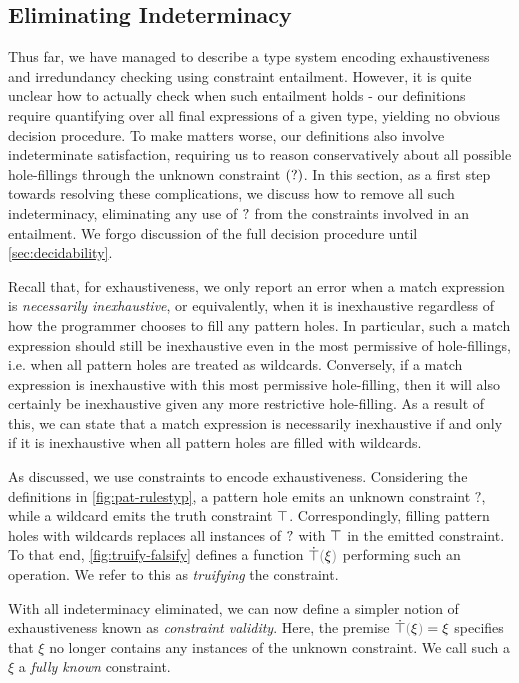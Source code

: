 \subsection{Eliminating Indeterminacy}\label{sec:analyses}
Thus far, we have managed to describe a type system encoding exhaustiveness and irredundancy checking using constraint entailment. However, it is quite unclear how to actually check when such entailment holds - our definitions require quantifying over all final expressions of a given type, yielding no obvious decision procedure. To make matters worse, our definitions also involve indeterminate satisfaction, requiring us to reason conservatively about all possible hole-fillings through the unknown constraint $(\mathtt{?})$. In this section, as a first step towards resolving these complications, we discuss how to remove all such indeterminacy, eliminating any use of $\mathtt{?}$ from the constraints involved in an entailment. We forgo discussion of the full decision procedure until \autoref{sec:decidability}.

Recall that, for exhaustiveness, we only report an error when a  match expression is \emph{necessarily inexhaustive}, or equivalently, when it is inexhaustive regardless of how the programmer chooses to fill any pattern holes. In particular, such a match expression should still be inexhaustive even in the most permissive of hole-fillings, i.e. when all pattern holes are treated as wildcards. Conversely, if a match expression is inexhaustive with this most permissive hole-filling, then it will also certainly be inexhaustive given any more restrictive hole-filling. As a result of this, we can state that a match expression is necessarily inexhaustive if and only if it is inexhaustive when all pattern holes are filled with wildcards. 

As discussed, we use constraints to encode exhaustiveness. Considering the definitions in \autoref{fig:pat-rulestyp}, a pattern hole emits an unknown constraint $?$, while a wildcard emits the truth constraint $\top$. Correspondingly, filling pattern holes with wildcards replaces all instances of $\mathtt{?}$ with $\top$ in the emitted constraint. To that end, \autoref{fig:truify-falsify} defines a function $\ctruify{\xi}$ performing such an operation. We refer to this as \emph{truifying} the constraint. 



With all indeterminacy eliminated, we can now define a simpler notion of exhaustiveness known as \emph{constraint validity}. Here, the premise $\ctruify{\xi} = \xi$ specifies that $\xi$ no longer contains any instances of the unknown constraint. We call such a $\xi$ a \emph{fully known} constraint.

